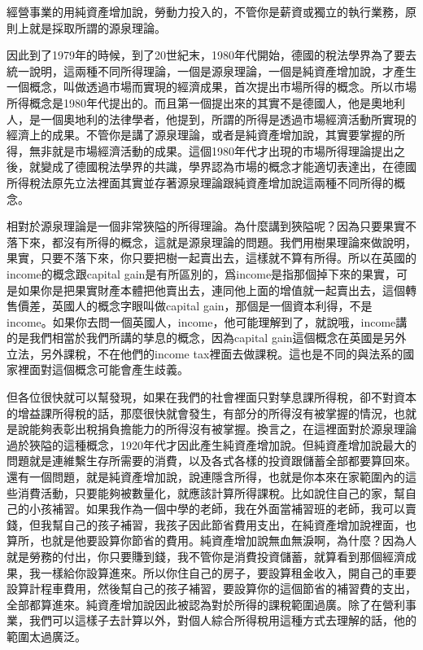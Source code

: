 \documentclass[oneside,sub3section]{ctexbook}
\begin{document}
經營事業的用純資產增加說，勞動力投入的，不管你是薪資或獨立的執行業務，原則上就是採取所謂的源泉理論。

因此到了1979年的時候，到了20世紀末，1980年代開始，德國的稅法學界為了要去統一說明，這兩種不同所得理論，一個是源泉理論，一個是純資產增加說，才產生一個概念，叫做透過市場而實現的經濟成果，首次提出市場所得的概念。所以市場所得概念是1980年代提出的。而且第一個提出來的其實不是德國人，他是奧地利人，是一個奧地利的法律學者，他提到，所謂的所得是透過市場經濟活動所實現的經濟上的成果。不管你是講了源泉理論，或者是純資產增加說，其實要掌握的所得，無非就是市場經濟活動的成果。這個1980年代才出現的市場所得理論提出之後，就變成了德國稅法學界的共識，學界認為市場的概念才能適切表達出，在德國所得稅法原先立法裡面其實並存著源泉理論跟純資產增加說這兩種不同所得的概念。

相對於源泉理論是一個非常狹隘的所得理論。為什麼講到狹隘呢？因為只要果實不落下來，都沒有所得的概念，這就是源泉理論的問題。我們用樹果理論來做說明，果實，只要不落下來，你只要把樹一起賣出去，這樣就不算有所得。所以在英國的income的概念跟capital gain是有所區別的，爲income是指那個掉下來的果實，可是如果你是把果實財產本體把他賣出去，連同他上面的增值就一起賣出去，這個轉售價差，英國人的概念字眼叫做capital gain，那個是一個資本利得，不是income。如果你去問一個英國人，income，他可能理解到了，就說哦，income講的是我們相當於我們所講的孳息的概念，因為capital gain這個概念在英國是另外立法，另外課稅，不在他們的income tax裡面去做課稅。這也是不同的與法系的國家裡面對這個概念可能會產生歧義。

但各位很快就可以幫發現，如果在我們的社會裡面只對孳息課所得稅，卻不對資本的增益課所得稅的話，那麼很快就會發生，有部分的所得沒有被掌握的情況，也就是說能夠表彰出稅捐負擔能力的所得沒有被掌握。換言之，在這裡面對於源泉理論過於狹隘的這種概念，1920年代才因此產生純資產增加說。但純資產增加說最大的問題就是連維繫生存所需要的消費，以及各式各樣的投資跟儲蓄全部都要算回來。還有一個問題，就是純資產增加說，說連隱含所得，也就是你本來在家範圍內的這些消費活動，只要能夠被數量化，就應該計算所得課稅。比如說住自己的家，幫自己的小孩補習。如果我作為一個中學的老師，我在外面當補習班的老師，我可以賣錢，但我幫自己的孩子補習，我孩子因此節省費用支出，在純資產增加說裡面，也算所，也就是他要設算你節省的費用。純資產增加說無血無淚啊，為什麼？因為人就是勞務的付出，你只要賺到錢，我不管你是消費投資儲蓄，就算看到那個經濟成果，我一樣給你設算進來。所以你住自己的房子，要設算租金收入，開自己的車要設算計程車費用，然後幫自己的孩子補習，要設算你的這個節省的補習費的支出，全部都算進來。純資產增加說因此被認為對於所得的課稅範圍過廣。除了在營利事業，我們可以這樣子去計算以外，對個人綜合所得稅用這種方式去理解的話，他的範圍太過廣泛。
\end{document}
